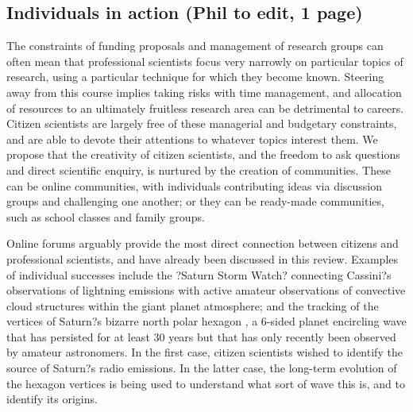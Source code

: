 \documentclass{ar2e}
\begin{document}

\subsection{Individuals in action (Phil to edit, 1 page)}
\label{sec:explore:individuals}

The constraints of funding proposals and management of research groups can
often mean that professional scientists focus very narrowly on particular
topics of research, using a particular technique for which they become known. 
Steering away from this course implies taking risks with time management, and
allocation of resources to an ultimately fruitless research area can be
detrimental to careers.  Citizen scientists are largely free of these
managerial and budgetary constraints, and are able to devote their attentions
to whatever topics interest them.  We propose that the creativity of citizen
scientists, and the freedom to ask questions and direct scientific enquiry, is
nurtured by the creation of communities.  These can be online communities,
with individuals contributing ideas via discussion groups and challenging one
another; or they can be ready-made communities, such as school classes and
family groups. 

Online forums arguably provide the most direct connection between citizens and
professional scientists, and have already been discussed in this review. 
Examples of individual successes include the ?Saturn Storm Watch? connecting
Cassini?s observations of lightning emissions with active amateur observations
of convective cloud structures within the giant planet atmosphere; and the
tracking of the vertices of Saturn?s bizarre north polar hexagon
\citep{88godfrey}, a 6-sided planet encircling wave that has persisted for at
least 30 years but that has only recently been observed by amateur
astronomers.  In the first case, citizen scientists wished to identify the
source of Saturn?s radio emissions.  In the latter case, the long-term
evolution of the hexagon vertices is being used to understand what sort of
wave this is, and to identify its origins.
\end{document}
